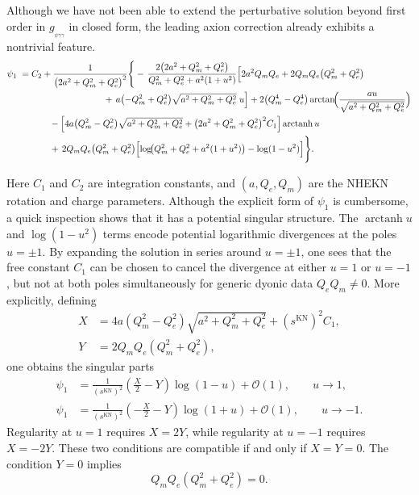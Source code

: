 \documentclass[11pt]{article}
\numberwithin{equation}{section} %
\begin{document}
Although we have not been able to   {extend the perturbative solution}  beyond first order  in $g_{_{\psi\gamma\gamma}}$ in closed form, the leading  axion correction already exhibits a nontrivial feature.
\begin{equation}
\begin{aligned}
\psi_1\;=\;&C_{2}
+\frac{1}{\bigl(2a^{2}+Q_m^{2}+Q_e^{2}\bigr)^{2}}
\Bigg\{
-\,\frac{2\bigl(2a^{2}+Q_m^{2}+Q_e^{2}\bigr)}{Q_m^{2}+Q_e^{2}+a^{2}(1+u^{2})}
\Bigl[
2a^{2}Q_m Q_e + 2Q_m Q_e\bigl(Q_m^{2}+Q_e^{2}\bigr)
\\
&\qquad\qquad\qquad\qquad
+\,a\bigl(-Q_m^{2}+Q_e^{2}\bigr)\sqrt{a^{2}+Q_m^{2}+Q_e^{2}}\;u
\Bigr]
+2\bigl(Q_m^{4}-Q_e^{4}\bigr)
\arctan\!\Bigl(\frac{a u}{\sqrt{a^{2}+Q_m^{2}+Q_e^{2}}}\Bigr)
\\
&\qquad
-\Bigl[
4a\bigl(Q_m^{2}-Q_e^{2}\bigr)\sqrt{a^{2}+Q_m^{2}+Q_e^{2}}
+\bigl(2a^{2}+Q_m^{2}+Q_e^{2}\bigr)^{2}C_{1}
\Bigr]\operatorname{arctanh}u
\\
&\qquad
+\,2Q_m Q_e\bigl(Q_m^{2}+Q_e^{2}\bigr)
\Bigl[
\log\!\bigl(Q_m^{2}+Q_e^{2}+a^{2}(1+u^{2})\bigr)
-\log(1-u^{2})
\Bigr]
\Bigg\}.
\end{aligned}
\end{equation}


Here $C_1$ and $C_2$ are integration constants, and $(a,Q_e,Q_m)$ are the NHEKN rotation and charge parameters. Although the explicit form of $\psi_1$ is cumbersome, a quick inspection shows that it has a potential  singular structure. The $\operatorname{arctanh}u$ and $\log(1-u^{2})$ terms encode potential logarithmic divergences at the poles $u=\pm 1$.   By expanding the solution in series around $u=\pm 1$, one sees that the free constant  $C_1$   {can be chosen}  to cancel the divergence at either $u=1$ or $u=-1$, but not at both poles simultaneously for generic dyonic data   {$Q_eQ_m\neq 0$}. More explicitly, defining
\begin{align}
 X &= 4a(Q_m^2-Q_e^2)\sqrt{a^2+Q_m^2+Q_e^2}+(s^{\scriptscriptstyle\mathrm{KN}})^2 C_1,\nonumber\\
 Y &= 2Q_mQ_e(Q_m^2+Q_e^2),
\end{align}
one obtains the singular parts
\begin{align}
 \psi_{1}
 &=\frac{1}{(s^{\scriptscriptstyle\mathrm{KN}})^2}\left(\frac{X}{2}- Y\right)\log(1-u)+\mathcal{O}(1),
 \qquad u\rightarrow 1,\nonumber\\
 \psi_{1}
 &=\frac{1}{(s^{\scriptscriptstyle\mathrm{KN}})^2}\left(-\frac{X}{2}-Y\right)\log(1+u)+\mathcal{O}(1),
 \qquad u\rightarrow -1 .
\end{align}
Regularity at $u=1$ requires $X=2Y$, while regularity at $u=-1$ requires $X=-2Y$. These two conditions are compatible if and only if $X=Y=0$. The condition $Y=0$ implies
\begin{equation}
 Q_mQ_e(Q_m^2+Q_e^2)=0.
\end{equation}
\end{document}
